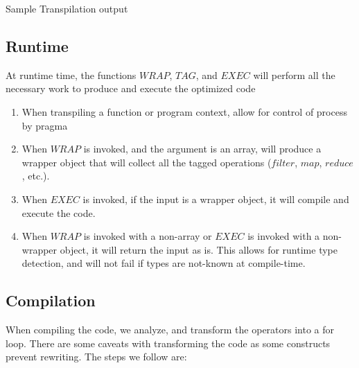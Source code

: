 \documentclass{article}
\begin{document}
  Sample Transpilation output  
  

\subsection{Runtime}
  At runtime time, the functions $WRAP$, $TAG$, and $EXEC$ will perform all the necessary work to produce 
  and execute the optimized code
  \begin{enumerate}
    \item When transpiling a function or program context, allow for control of process by pragma
    \item When $WRAP$ is invoked, and the argument is an array, will produce a wrapper object that will collect 
      all the tagged operations ($filter$, $map$, $reduce$, etc.).  
    \item When $EXEC$ is invoked, if the input is a wrapper object, it will compile and execute the code.      
    \item When $WRAP$ is invoked with a non-array or $EXEC$ is invoked with a non-wrapper object, 
      it will return the input as is.  This allows for runtime type detection, and will not fail if 
      types are not-known at compile-time.          
  \end{enumerate}

\subsection{Compilation}
  When compiling the code, we analyze, and transform the operators into a for loop.  There are some
  caveats with transforming the code as some constructs prevent rewriting. The steps we follow are:
\end{document}
